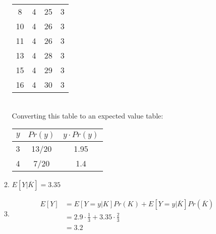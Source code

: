 \documentclass{article}
\begin{document}
\begin{enumerate}
\begin{enumerate}[label=\arabic*.]
\begin{multicols}{2}
\begin{tabular}{c|c||c|c}
                            8     & 4           & 25    & 3           \\
                            10    & 4           & 26    & 3           \\
                            11    & 4           & 26    & 3           \\
                            13    & 4           & 28    & 3           \\
                            15    & 4           & 29    & 3           \\
                            16    & 4           & 30    & 3           \\
                        \end{tabular}
                        \columnbreak \\[5em]
                        Converting this table to an expected value table:
                        \begin{tabular}{c|c|c}
                            $y$ & $Pr(y)$ & $y \cdot Pr(y)$ \\
                            \hline
                            3   & 13/20   & 1.95            \\
                            4   & 7/20    & 1.4
                        \end{tabular}
                    \end{multicols}
              \item \(E[Y | \overline{K}] = 3.35\)
              \item \begin{align*}
                        E[Y] & = E[Y = y | K]Pr(K)      + E[Y = y | \overline{K}]Pr(\overline{K}) \\
                             & = 2.9 \cdot \frac{1}{3}  + 3.35 \cdot \frac{2}{3}                  \\
                             & = 3.2
                    \end{align*}
          \end{enumerate}

\end{enumerate}
\end{document}
